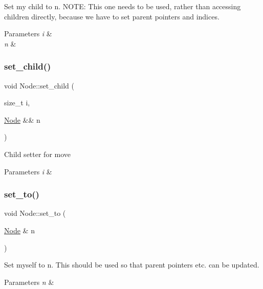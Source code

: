Set my child to n. N\+O\+TE\+: This one needs to be used, rather than accessing children directly, because we have to set parent pointers and indices. 
\begin{DoxyParams}{Parameters}
{\em i} & \\
\hline
{\em n} & \\
\hline
\end{DoxyParams}
\mbox{\label{class_node_a486882370d2c9592c6eabb52a3289253}} 
\subsubsection{\texorpdfstring{set\+\_\+child()}{set\_child()}\hspace{0.1cm}{\footnotesize\ttfamily [2/2]}}
{\footnotesize\ttfamily void Node\+::set\+\_\+child (\begin{DoxyParamCaption}\item[{size\+\_\+t}]{i,  }\item[{\hyperlink{class_node}{Node} \&\&}]{n }\end{DoxyParamCaption})\hspace{0.3cm}{\ttfamily [inline]}}

Child setter for move 
\begin{DoxyParams}{Parameters}
{\em i} & \\
\hline
\end{DoxyParams}
\mbox{\label{class_node_a1a6f6c8062e66046c302a80cc7e8d817}} 
\subsubsection{\texorpdfstring{set\+\_\+to()}{set\_to()}\hspace{0.1cm}{\footnotesize\ttfamily [1/2]}}
{\footnotesize\ttfamily void Node\+::set\+\_\+to (\begin{DoxyParamCaption}\item[{\hyperlink{class_node}{Node} \&}]{n }\end{DoxyParamCaption})\hspace{0.3cm}{\ttfamily [inline]}}

Set myself to n. This should be used so that parent pointers etc. can be updated. 
\begin{DoxyParams}{Parameters}
{\em n} & \\
\hline
\end{DoxyParams}
\mbox{\label{class_node_a10c63ea2ec819dc5b195c4df33cde113}} 
